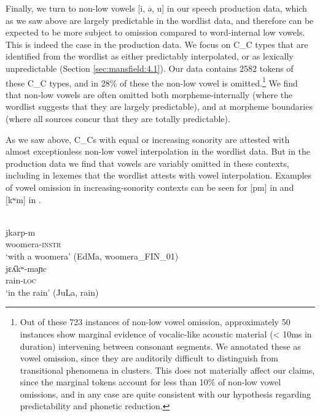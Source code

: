 \documentclass[output=paper,colorlinks,citecolor=brown]{langscibook}
\begin{document}
Finally, we turn to non-low vowels [i, ə, u] in our speech production data, which as we saw above are largely predictable in the wordlist data, and therefore can be expected to be more subject to omission compared to word-internal low vowels. This is indeed the case in the production data. We focus on C\_C types that are identified from the wordlist as either predictably interpolated, or as lexically unpredictable (Section \ref{sec:mansfield:4.1}). Our data contains 2582 tokens of these C\_C types, and in 28\% of these the non-low vowel is omitted.\footnote{Out of these 723 instances of non-low vowel omission, approximately 50 instances show marginal evidence of vocalic-like acoustic material (< 10ms in duration) intervening between consonant segments. We annotated these as vowel omission, since they are auditorily difficult to distinguish from transitional phenomena in clusters. This does not materially affect our claims, since the marginal tokens account for less than 10\% of non-low vowel omissions, and in any case are quite consistent with our hypothesis regarding predictability and phonetic reduction.} We find that non-low vowels are often omitted both morpheme-internally (where the wordlist suggests that they are largely predictable), and at morpheme boundaries (where all sources concur that they are totally predictable).

As we saw above, C\_Cs with equal or increasing sonority are attested with almost exceptionless non-low vowel interpolation in the wordlist data. But in the production data we find that vowels are variably omitted in these contexts, including in lexemes that the wordlist attests with vowel interpolation. Examples of vowel omission in increasing-sonority contexts can be seen for [pm] in  and [kʷm] in . 

\ea\label{ex:mansfield:4}
 \\
       jkarp-m\\
       woomera-\textsc{instr}\\
\glt   ‘with a woomera’ (EdMa, woomera\_FIN\_01)
\ex\label{ex:mansfield:5}
 \\
     jɛʎkʷ-maɲc\\
     rain-\textsc{loc}\\
\glt   ‘in the rain’ (JuLa, rain)
\z
\end{document}

